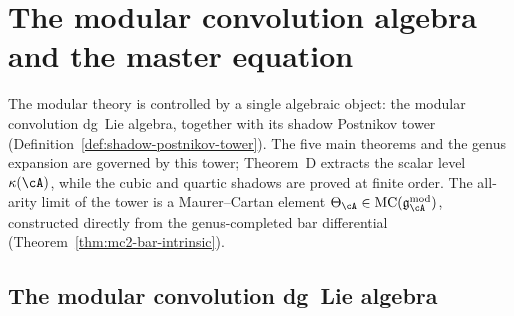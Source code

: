 
\section{The modular convolution algebra and the master equation}
\label{sec:modular-bar-hamiltonian}

The modular theory is controlled by a single
algebraic object: the modular convolution dg~Lie algebra, together
with its shadow Postnikov tower
(Definition~\ref{def:shadow-postnikov-tower}).
The five main theorems and the genus expansion are governed by this
tower; Theorem~D extracts the scalar level~$\kappa(\cA)$, while the
cubic and quartic shadows are proved at finite order.
The all-arity limit of the tower is a
Maurer--Cartan element
$\Theta_{\cA} \in \operatorname{MC}(\mathfrak{g}^{\mathrm{mod}}_{\cA})$,
constructed directly from the genus-completed bar differential
(Theorem~\ref{thm:mc2-bar-intrinsic}).

\subsection{The modular convolution dg~Lie algebra}
\label{subsec:modular-convolution-algebra}

